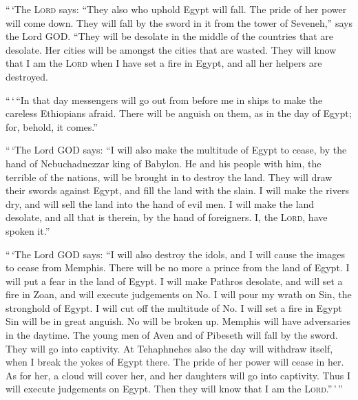  ``\,`The \textsc{Lord} says: ``They also who uphold Egypt
will fall. The pride of her power will come down. They will fall by the
sword in it from the tower of Seveneh,'' says the Lord GOD.
 ``They will be desolate in the middle of the countries
that are desolate. Her cities will be amongst the cities that are
wasted.  They will know that I am the \textsc{Lord} when I
have set a fire in Egypt, and all her helpers are destroyed.

 ``\,`\,``In that day messengers will go out from before
me in ships to make the careless Ethiopians afraid. There will be
anguish on them, as in the day of Egypt; for, behold, it comes.''

 ``\,`The Lord GOD says: ``I will also make the multitude
of Egypt to cease, by the hand of Nebuchadnezzar king of Babylon.
 He and his people with him, the terrible of the nations,
will be brought in to destroy the land. They will draw their swords
against Egypt, and fill the land with the slain.  I will
make the rivers dry, and will sell the land into the hand of evil men. I
will make the land desolate, and all that is therein, by the hand of
foreigners. I, the \textsc{Lord}, have spoken it.''

 ``\,`The Lord GOD says: ``I will also destroy the idols,
and I will cause the images to cease from Memphis. There will be no more
a prince from the land of Egypt. I will put a fear in the land of Egypt.
 I will make Pathros desolate, and will set a fire in
Zoan, and will execute judgements on No.  I will pour my
wrath on Sin, the stronghold of Egypt. I will cut off the multitude of
No.  I will set a fire in Egypt Sin will be in great
anguish. No will be broken up. Memphis will have adversaries in the
daytime.  The young men of Aven and of Pibeseth will fall
by the sword. They will go into captivity.  At
Tehaphnehes also the day will withdraw itself, when I break the yokes of
Egypt there. The pride of her power will cease in her. As for her, a
cloud will cover her, and her daughters will go into captivity.
 Thus I will execute judgements on Egypt. Then they will
know that I am the \textsc{Lord}.''\,'\,''

